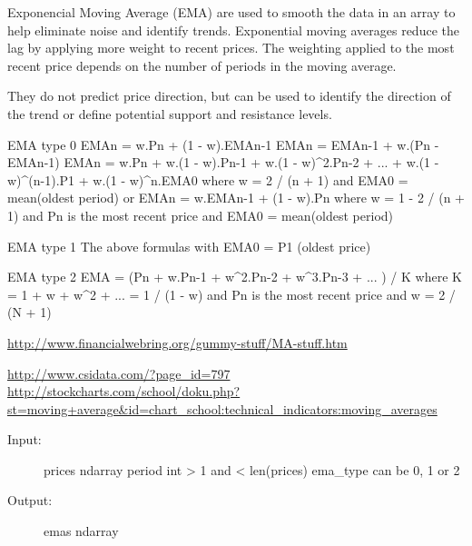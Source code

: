 \documentclass[letterpaper,10pt,english]{sphinxmanual}
\begin{document}
\begin{fulllineitems}
\end{fulllineitems}


\begin{fulllineitems}
\label{reference:technical_indicators.technical_indicators.ema}
Exponencial Moving Average (EMA) are used to smooth the data in an array to
help eliminate noise and identify trends.
Exponential moving averages reduce the lag by applying more weight to
recent prices.
The weighting applied to the most recent price depends on the number of
periods in the moving average.

They do not predict price direction, but can be used to identify the
direction of the trend or define potential support and resistance levels.

EMA type 0
EMAn = w.Pn + (1 - w).EMAn-1
EMAn = EMAn-1 + w.(Pn - EMAn-1)
EMAn = w.Pn + w.(1 - w).Pn-1 + w.(1 - w)\textasciicircum{}2.Pn-2 + ... +
w.(1 - w)\textasciicircum{}(n-1).P1 + w.(1 - w)\textasciicircum{}n.EMA0
where w = 2 / (n + 1) and EMA0 = mean(oldest period)
or
EMAn = w.EMAn-1 + (1 - w).Pn
where w = 1 - 2 / (n + 1) and Pn is the most recent price
and EMA0 = mean(oldest period)

EMA type 1
The above formulas with EMA0 = P1 (oldest price)

EMA type 2
EMA = (Pn + w.Pn-1 + w\textasciicircum{}2.Pn-2 + w\textasciicircum{}3.Pn-3 + ... ) / K
where K = 1 + w + w\textasciicircum{}2 + ... = 1 / (1 - w) and Pn is the most recent price
and w = 2 / (N + 1)

\href{http://www.financialwebring.org/gummy-stuff/MA-stuff.htm}{http://www.financialwebring.org/gummy-stuff/MA-stuff.htm}

\href{http://www.csidata.com/?page\_id=797}{http://www.csidata.com/?page\_id=797}
\href{http://stockcharts.com/school/doku.php?st=moving+average\&id=chart\_school:technical\_indicators:moving\_averages}{http://stockcharts.com/school/doku.php?st=moving+average\&id=chart\_school:technical\_indicators:moving\_averages}
\begin{description}
\item[{Input:}] \leavevmode
prices ndarray
period int \textgreater{} 1 and \textless{} len(prices)
ema\_type can be 0, 1 or 2

\item[{Output:}] \leavevmode
emas ndarray


\end{description}
\end{fulllineitems}
\end{document}
